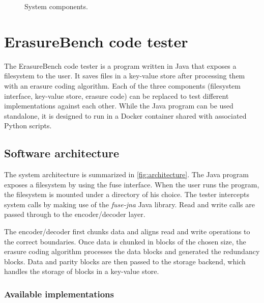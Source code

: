 \begin{figure}
    \centering
    
    \caption{System components.}
    \label{fig:architecture}
\end{figure}

\section{ErasureBench code tester}

The ErasureBench code tester is a program written in Java that exposes a filesystem to the user.
It saves files in a key-value store after processing them with an erasure coding algorithm.
Each of the three components (filesystem interface, key-value store, erasure code) can be replaced to test different implementations against each other. While the Java program can be used standalone, it is designed to run in a Docker container shared with associated Python scripts.

\subsection{Software architecture}
\label{subsec:architecture}

The system architecture is summarized in \autoref{fig:architecture}. The Java program exposes a filesystem by using the \ac{fuse} interface. When the user runs the program, the filesystem is mounted under a directory of his choice. The tester intercepts system calls by making use of the \textit{fuse-jna} \autocite{fuse-jna} Java library. Read and write calls are passed through to the encoder/decoder layer.

The encoder/decoder first chunks data and aligns read and write operations to the correct boundaries. Once data is chunked in blocks of the chosen size, the erasure coding algorithm processes the data blocks and generated the redundancy blocks. Data and parity blocks are then passed to the storage backend, which handles the storage of blocks in a key-value store.

\subsubsection{Available implementations}

